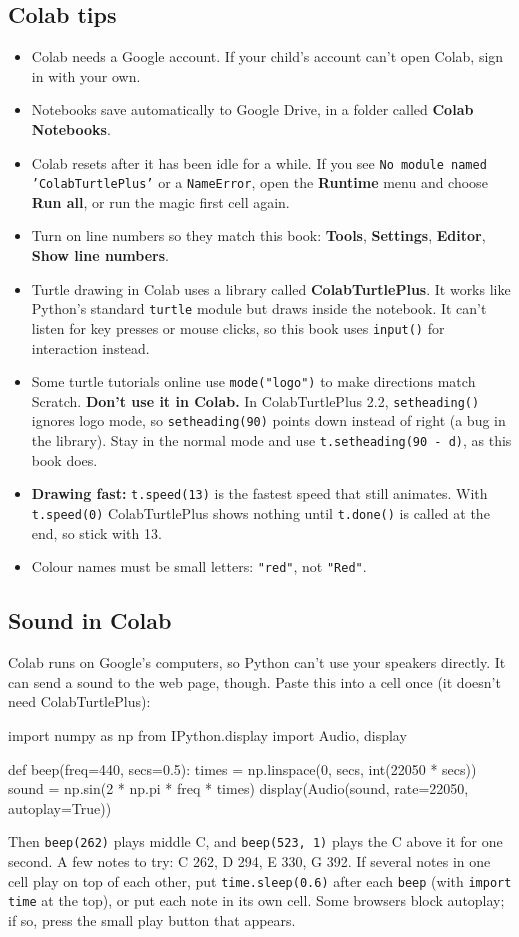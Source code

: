 \documentclass[12pt,a4paper]{article}
\newcommand{\py}{\lstinline[style=inl]}
\begin{document}
\subsection*{Colab tips}
\begin{itemize}
  \item Colab needs a Google account. If your child's account can't open Colab, sign in with your own.
  \item Notebooks save automatically to Google Drive, in a folder called \textbf{Colab Notebooks}.
  \item Colab resets after it has been idle for a while. If you see \texttt{No module named 'ColabTurtlePlus'} or a \texttt{NameError}, open the \textbf{Runtime} menu and choose \textbf{Run all}, or run the magic first cell again.
  \item Turn on line numbers so they match this book: \textbf{Tools}, \textbf{Settings}, \textbf{Editor}, \textbf{Show line numbers}.
  \item Turtle drawing in Colab uses a library called \textbf{ColabTurtlePlus}. It works like Python's standard \texttt{turtle} module but draws inside the notebook. It can't listen for key presses or mouse clicks, so this book uses \texttt{input()} for interaction instead.
  \item Some turtle tutorials online use \py|mode("logo")| to make directions match Scratch. \textbf{Don't use it in Colab.} In ColabTurtlePlus 2.2, \py|setheading()| ignores logo mode, so \py|setheading(90)| points down instead of right (a bug in the library). Stay in the normal mode and use \py|t.setheading(90 - d)|, as this book does.
  \item \textbf{Drawing fast:} \py|t.speed(13)| is the fastest speed that still animates. With \py|t.speed(0)| ColabTurtlePlus shows nothing until \py|t.done()| is called at the end, so stick with 13.
  \item Colour names must be small letters: \py|"red"|, not \py|"Red"|.
\end{itemize}

\subsection*{Sound in Colab}
Colab runs on Google's computers, so Python can't use your speakers directly. It can send a sound to the web page, though. Paste this into a cell once (it doesn't need ColabTurtlePlus):
\begin{code}
import numpy as np
from IPython.display import Audio, display

def beep(freq=440, secs=0.5):
    times = np.linspace(0, secs, int(22050 * secs))
    sound = np.sin(2 * np.pi * freq * times)
    display(Audio(sound, rate=22050, autoplay=True))
\end{code}
Then \py|beep(262)| plays middle C, and \py|beep(523, 1)| plays the C above it for one second. A few notes to try: C 262, D 294, E 330, G 392. If several notes in one cell play on top of each other, put \py|time.sleep(0.6)| after each \py|beep| (with \py|import time| at the top), or put each note in its own cell. Some browsers block autoplay; if so, press the small play button that appears.
\end{document}
